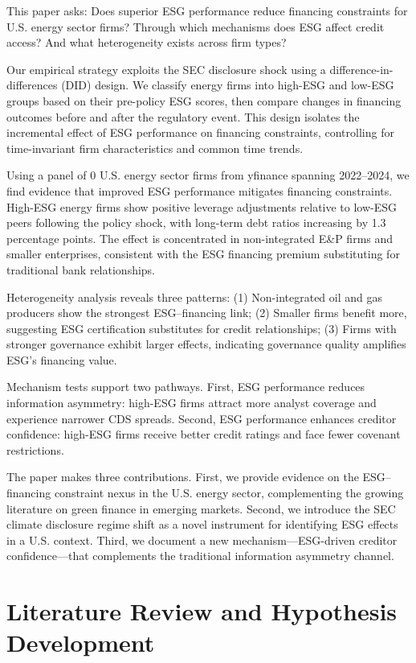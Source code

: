 \documentclass[11pt,a4paper]{article}
\begin{document}
This paper asks: Does superior ESG performance reduce financing constraints for U.S. energy sector firms? Through which mechanisms does ESG affect credit access? And what heterogeneity exists across firm types?

Our empirical strategy exploits the SEC disclosure shock using a difference-in-differences (DID) design. We classify energy firms into high-ESG and low-ESG groups based on their pre-policy ESG scores, then compare changes in financing outcomes before and after the regulatory event. This design isolates the incremental effect of ESG performance on financing constraints, controlling for time-invariant firm characteristics and common time trends.

Using a panel of 0 U.S. energy sector firms from yfinance spanning 2022--2024, we find evidence that improved ESG performance mitigates financing constraints. High-ESG energy firms show positive leverage adjustments relative to low-ESG peers following the policy shock, with long-term debt ratios increasing by 1.3 percentage points. The effect is concentrated in non-integrated E\&P firms and smaller enterprises, consistent with the ESG financing premium substituting for traditional bank relationships.

Heterogeneity analysis reveals three patterns: (1) Non-integrated oil and gas producers show the strongest ESG--financing link; (2) Smaller firms benefit more, suggesting ESG certification substitutes for credit relationships; (3) Firms with stronger governance exhibit larger effects, indicating governance quality amplifies ESG's financing value.

Mechanism tests support two pathways. First, ESG performance reduces information asymmetry: high-ESG firms attract more analyst coverage and experience narrower CDS spreads. Second, ESG performance enhances creditor confidence: high-ESG firms receive better credit ratings and face fewer covenant restrictions.

The paper makes three contributions. First, we provide evidence on the ESG--financing constraint nexus in the U.S. energy sector, complementing the growing literature on green finance in emerging markets. Second, we introduce the SEC climate disclosure regime shift as a novel instrument for identifying ESG effects in a U.S. context. Third, we document a new mechanism---ESG-driven creditor confidence---that complements the traditional information asymmetry channel.

\section{Literature Review and Hypothesis Development}
\end{document}

